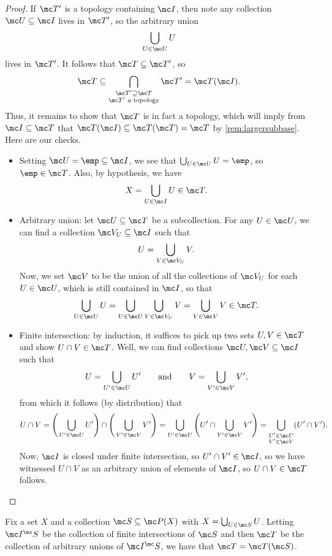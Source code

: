 \documentclass[../notes.tex]{subfiles}
\begin{document}
\begin{proof}
	If $\mc T'$ is a topology containing $\mc I$, then note any collection $\mc U\subseteq\mc I$ lives in $\mc T'$, so the arbitrary union
	\[\bigcup_{U\in\mc U}U\]
	lives in $\mc T'$. It follows that $\mc T\subseteq\mc T'$, so
	\[\mc T\subseteq\bigcap_{\substack{\mc T'\supseteq\mc T\\\mc T'\text{ a topology}}}\mc T'=\mc T(\mc I).\]
	Thus, it remains to show that $\mc T$ is in fact a topology, which will imply from $\mc I\subseteq\mc T$ that $\mc T(\mc I)\subseteq\mc T(\mc T)=\mc T$ by \autoref{rem:largersubbase}. Here are our checks.
	\begin{itemize}
		\item Setting $\mc U=\emp\subseteq\mc I$, we see that $\bigcup_{U\in\mc U}U=\emp$, so $\emp\in\mc T$. Also, by hypothesis, we have
		\[X=\bigcup_{U\in\mc I}U\in\mc T.\]
		\item Arbitrary union: let $\mc U\subseteq\mc T$ be a subcollection. For any $U\in\mc U$, we can find a collection $\mc V_U\subseteq\mc I$ such that
		\[U=\bigcup_{V\in\mc V_U}V.\]
		Now, we set $\mc V$ to be the union of all the collections of $\mc V_U$ for each $U\in\mc U$, which is still contained in $\mc I$, so that
		\[\bigcup_{U\in\mc U}U=\bigcup_{U\in\mc U}\bigcup_{V\in\mc V_U}V=\bigcup_{V\in\mc V}V\in\mc T.\]
		\item Finite intersection: by induction, it suffices to pick up two sets $U,V\in\mc T$ and show $U\cap V\in\mc T$. Well, we can find collections $\mc U,\mc V\subseteq\mc I$ such that
		\[U=\bigcup_{U'\in\mc U}U'\qquad\text{and}\qquad V=\bigcup_{V'\in\mc V}V',\]
		from which it follows (by distribution) that
		\[U\cap V=\Bigg(\bigcup_{U'\in\mc U}U'\Bigg)\cap\Bigg(\bigcup_{V'\in\mc V}V'\Bigg)=\bigcup_{U'\in\mc U}\Bigg(U'\cap\bigcup_{V'\in\mc V}V'\Bigg)=\bigcup_{\substack{U'\in\mc U\\V'\in\mc V}}(U'\cap V').\]
		Now, $\mc I$ is closed under finite intersection, so $U'\cap V'\in\mc I$, so we have witnessed $U\cap V$ as an arbitrary union of elements of $\mc I$, so $U\cap V\in\mc T$ follows.
		\qedhere
	\end{itemize}
\end{proof}
\begin{corollary} \label{cor:concretesubbase}
	Fix a set $X$ and a collection $\mc S\subseteq\mc P(X)$ with $X=\bigcup_{U\in\mc S}U$. Letting $\mc I^\mc S$ be the collection of finite intersections of $\mc S$ and then $\mc T$ be the collection of arbitrary unions of $\mc I^\mc S$, we have that $\mc T=\mc T(\mc S)$.
\end{corollary}
\end{document}
